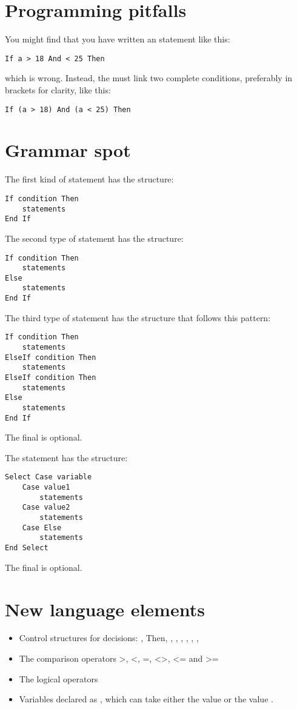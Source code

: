 	\section{Programming pitfalls}
		You might find that you have written an  statement like this:
		\begin{lstlisting}
If a > 18 And < 25 Then
		\end{lstlisting}
		which is wrong. Instead, the  must link two complete conditions, preferably in brackets for clarity, like this:
		\begin{lstlisting}
If (a > 18) And (a < 25) Then
		\end{lstlisting}

	\section{Grammar spot}
		The first kind of  statement has the structure:
		\begin{lstlisting}
If condition Then
	statements
End If
		\end{lstlisting}
		The second type of  statement has the structure:
		\begin{lstlisting}
If condition Then
	statements
Else
	statements
End If
		\end{lstlisting}
		The third type of  statement has the structure that follows this pattern:
		\begin{lstlisting}
If condition Then
	statements
ElseIf condition Then
	statements
ElseIf condition Then
	statements
Else
	statements
End If
		\end{lstlisting}
		The final  is optional.
		
		The  statement has the structure:
		\begin{lstlisting}
Select Case variable
	Case value1
		statements
	Case value2
		statements
	Case Else
		statements
End Select
		\end{lstlisting}
		The final  is optional.

	\section{New language elements}
		\begin{itemize}
			\item Control structures for decisions: , Then, , , , , , , 
			\item The comparison operators >, <, =, <>, <= and >=
			\item The logical operators   
			\item Variables declared as , which can take either the value  or the value .
		\end{itemize}



